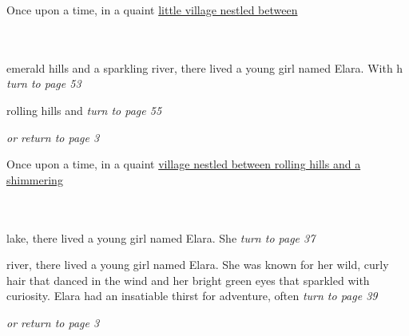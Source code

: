 \documentclass{memoir}
\begin{document}
        \hspace{1cm}\vfill
        \begin{minipage}{3in}
        \LARGE
        Once upon a time, in a quaint \ul{little village nestled between}\\ \vspace{5mm} \\
  \\ 

        \hspace{1cm}\begin{minipage}{6cm}
        \normalsize
            emerald hills and a sparkling river, there lived a young girl named Elara. With h \hfill \textit{turn to page 53}\\ \vspace{5mm}

rolling hills and  \hfill \textit{turn to page 55}\\ \vspace{5mm}

\hfill \textit{or return to page 3}
        \end{minipage} 
        \end{minipage}
        \hspace{1cm}\vfill
        \cleardoublepage

        


        \hspace{1cm}\vfill
        \begin{minipage}{3in}
        \LARGE
        Once upon a time, in a quaint \ul{village nestled between rolling hills and a shimmering}\\ \vspace{5mm} \\
  \\ 

        \hspace{1cm}\begin{minipage}{6cm}
        \normalsize
            lake, there lived a young girl named Elara. She  \hfill \textit{turn to page 37}\\ \vspace{5mm}

river, there lived a young girl named Elara. She was known for her wild, curly hair that danced in the wind and her bright green eyes that sparkled with curiosity. Elara had an insatiable thirst for adventure, often \hfill \textit{turn to page 39}\\ \vspace{5mm}

\hfill \textit{or return to page 3}
        \end{minipage} 
        \end{minipage}
        \hspace{1cm}\vfill
        \cleardoublepage
\end{document}
